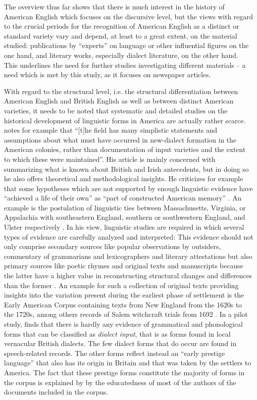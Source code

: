 The overview thus far shows that there is much interest in the history of American English which focuses on the discursive level, but the views with regard to the crucial periods for the recognition of American English as a distinct or standard variety vary and depend, at least to a great extent, on the material studied: publications by “experts” on language or other influential figures on the one hand, and literary works, especially dialect literature, on the other hand. This underlines the need for further studies investigating different materials – a need which is met by this study, as it focuses on newspaper articles.

With regard to the structural level, i.e. the structural differentiation between American English and British English as well as between distinct American varieties, it needs to be noted that systematic and detailed studies on the historical development of linguistic forms in America are actually rather scarce. \citet[152]{Montgomery2001} notes for example that “[t]he field has many simplistic statements and assumptions about what must have occurred in new-dialect formation in the American colonies, rather than documentation of input varieties and the extent to which these were maintained”. His article is mainly concerned with summarizing what is known about British and Irish antecedents, but in doing so he also offers theoretical and methodological insights. He criticizes for example that some hypotheses which are not supported by enough linguistic evidence have “achieved a life of their own” as “part of constructed American memory” \citep[111]{Montgomery2001}. An example is the postulation of linguistic ties between Massachusetts, Virginia, or Appalachia with southeastern England, southern or southwestern England, and Ulster respectively \citep[109]{Montgomery2001}. In his view, linguistic studies are required in which several types of evidence are carefully analyzed and interpreted: This evidence should not only comprise secondary sources like popular observations by outsiders, commentary of grammarians and lexicographers and literary attestations but also primary sources like poetic rhymes and original texts and manuscripts because the latter have a higher value in reconstructing structural changes and differences than the former \citep[97]{Montgomery2001}. An example for such a collection of original texts providing insights into the variation present during the earliest phase of settlement is the Early American Corpus containing texts from New England from the 1620s to the 1720s, among others records of Salem witchcraft trials from 1692 \citep{Kyto2004}. In a pilot study, \citet{Kyto2004} finds that there is hardly any evidence of grammatical and phonological forms that can be classified as \textit{dialect input}, that is as forms found in local vernacular British dialects. The few dialect forms that do occur are found in speech-related records. The other forms reflect instead an “early prestige language” that also has its origin in Britain and that was taken by the settlers to America. The fact that these prestige forms constitute the majority of forms in the corpus is explained by \citet[151]{Kyto2004} by the educatedness of most of the authors of the documents included in the corpus. 